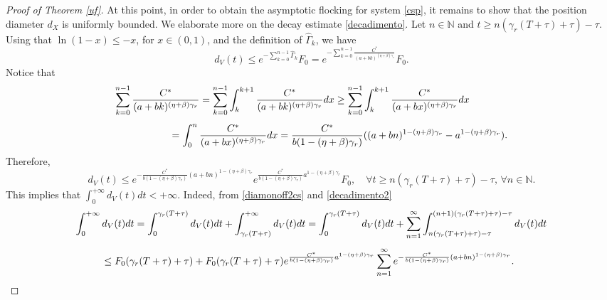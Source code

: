 \documentclass[11pt]{article}
\begin{document}
\begin{proof}[Proof of Theorem \ref{uf}]
    At this point, in order to obtain the asymptotic flocking for system \eqref{csp}, it remains to show that the position diameter $d_X$ is uniformly bounded. We elaborate more on the decay estimate \eqref{decadimento}. Let $n\in\mathbb{N}$ and $t\geq n(\gamma_r(T+\tau)+\tau)-\tau$. Using that $\ln(1-x)\leq -x$, for $x\in (0,1)$, and the definition of $\hat{\Gamma}_k$, we have
    $$d_V(t)\leq e^{-\sum\limits_{k=0}^{n-1}\hat{\Gamma}_k}F_0=  e^{-\sum\limits_{k=0}^{n-1}\frac{C^*}{(a+bk)^{(\eta+\beta)\gamma_r}}}F_0.$$
    Notice that
    $$\begin{array}{l}
    \vspace{0.3cm}\displaystyle{\sum_{k=0}^{n-1}\frac{C^*}{(a+bk)^{(\eta+\beta)\gamma_r}}=\sum_{k=0}^{n-1}\int_{k}^{k+1}\frac{C^*}{(a+bk)^{(\eta+\beta)\gamma_r}}dx\geq \sum_{k=0}^{n-1}\int_{k}^{k+1}\frac{C^*}{(a+bx)^{(\eta+\beta)\gamma_r}}dx}\\
    \displaystyle{\hspace{2cm}=\int_0^n \frac{C^*}{(a+bx)^{(\eta+\beta)\gamma_r}} dx=\frac{C^*}{b(1-(\eta+\beta)\gamma_r)}((a+bn)^{1-(\eta+\beta)\gamma_r}-a^{1-(\eta+\beta)\gamma_r}).}
    \end{array}$$
    Therefore, 
    \begin{equation}\label{decadimento2}
        d_V(t)\leq e^{-\frac{C^*}{b(1-(\eta+\beta)\gamma_r)}(a+bn)^{1-(\eta+\beta)\gamma_r}}e^{\frac{C^*}{b(1-(\eta+\beta)\gamma_r)}a^{1-(\eta+\beta)\gamma_r}}F_0,\quad \forall t\geq n(\gamma_r(T+\tau)+\tau)-\tau,\,\forall n\in \mathbb{N}.
    \end{equation}
    This implies that $\int_0^{+\infty}d_V(t)dt<+\infty.$ Indeed, from \eqref{diamonoff2cs} and \eqref{decadimento2}
    \begin{equation}\label{stimaint}
        \begin{array}{l}
    \vspace{0.3cm}\displaystyle{\int_0^{+\infty}d_V(t)dt=\int_0^{\gamma_r(T+\tau)}d_V(t)dt+\int_{\gamma_r(T+\tau)}^{+\infty}d_V(t)dt=\int_0^{\gamma_r(T+\tau)}d_V(t)dt+\sum_{n=1}^{\infty}\int_{n(\gamma_r(T+\tau)+\tau)-\tau}^{(n+1)(\gamma_r(T+\tau)+\tau)-\tau}d_V(t)dt}\\
    \displaystyle{\hspace{1cm}\leq F_0(\gamma_r(T+\tau)+\tau)+F_0(\gamma_r(T+\tau)+\tau)e^{\frac{C^*}{b(1-(\eta+\beta)\gamma_r)
    }a^{1-(\eta+\beta)\gamma_r}}\sum_{n=1}^{\infty}e^{-\frac{C^*}{b(1-(\eta+\beta)\gamma_r)}(a+bn)^{1-(\eta+\beta)\gamma_r}}.}
    \end{array}
    \end{equation}

\end{proof}
\end{document}
